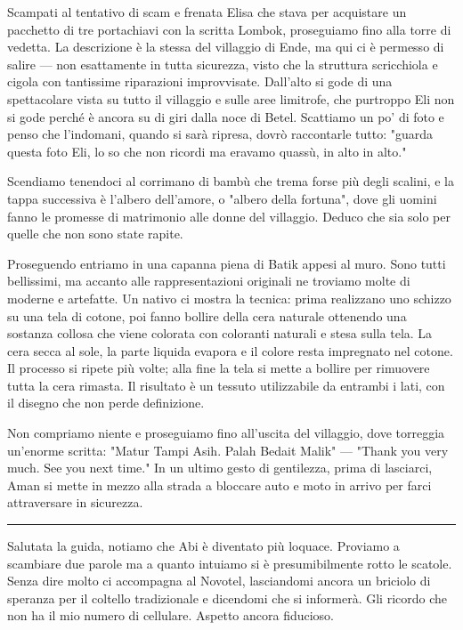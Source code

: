 Scampati al tentativo di scam e frenata Elisa che stava per acquistare un pacchetto di tre portachiavi con la scritta Lombok, proseguiamo fino alla torre di vedetta. La descrizione è la stessa del villaggio di Ende, ma qui ci è permesso di salire — non esattamente in tutta sicurezza, visto che la struttura scricchiola e cigola con tantissime riparazioni improvvisate. Dall'alto si gode di una spettacolare vista su tutto il villaggio e sulle aree limitrofe, che purtroppo Eli non si gode perché è ancora su di giri dalla noce di Betel. Scattiamo un po' di foto e penso che l'indomani, quando si sarà ripresa, dovrò raccontarle tutto: "guarda questa foto Eli, lo so che non ricordi ma eravamo quassù, in alto in alto."

Scendiamo tenendoci al corrimano di bambù che trema forse più degli scalini, e la tappa successiva è l'albero dell'amore, o "albero della fortuna", dove gli uomini fanno le promesse di matrimonio alle donne del villaggio. Deduco che sia solo per quelle che non sono state rapite.

Proseguendo entriamo in una capanna piena di Batik appesi al muro. Sono tutti bellissimi, ma accanto alle rappresentazioni originali ne troviamo molte di moderne e artefatte. Un nativo ci mostra la tecnica: prima realizzano uno schizzo su una tela di cotone, poi fanno bollire della cera naturale ottenendo una sostanza collosa che viene colorata con coloranti naturali e stesa sulla tela. La cera secca al sole, la parte liquida evapora e il colore resta impregnato nel cotone. Il processo si ripete più volte; alla fine la tela si mette a bollire per rimuovere tutta la cera rimasta. Il risultato è un tessuto utilizzabile da entrambi i lati, con il disegno che non perde definizione.

Non compriamo niente e proseguiamo fino all'uscita del villaggio, dove torreggia un'enorme scritta: "Matur Tampi Asih. Palah Bedait Malik" — "Thank you very much. See you next time." In un ultimo gesto di gentilezza, prima di lasciarci, Aman si mette in mezzo alla strada a bloccare auto e moto in arrivo per farci attraversare in sicurezza.

\begin{center}
    \noindent\rule{0.6\textwidth}{0.4pt}
\end{center}

Salutata la guida, notiamo che Abi è diventato più loquace. Proviamo a scambiare due parole ma a quanto intuiamo si è presumibilmente rotto le scatole. Senza dire molto ci accompagna al Novotel, lasciandomi ancora un briciolo di speranza per il coltello tradizionale e dicendomi che si informerà. Gli ricordo che non ha il mio numero di cellulare. Aspetto ancora fiducioso.

